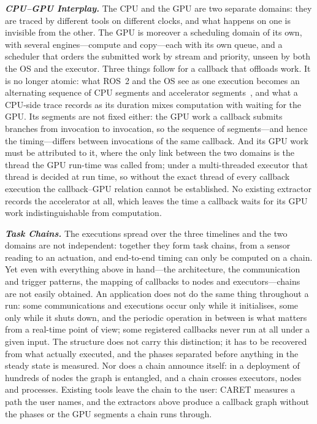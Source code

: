 \noindent
\textit{\textbf{CPU--GPU Interplay.}}
The CPU and the GPU are two separate domains: they are traced by different tools on different clocks, and what happens on one is invisible from the other. The GPU is moreover a scheduling domain of its own, with several engines---compute and copy---each with its own queue, and a scheduler that orders the submitted work by stream and priority, unseen by both the OS and the executor. Three things follow for a callback that offloads work. It is no longer atomic: what ROS~2 and the OS see as one execution becomes an alternating sequence of CPU segments and accelerator segments~\cite{enright-2024-paam}, and what a CPU-side trace records as its duration mixes computation with waiting for the GPU. Its segments are not fixed either: the GPU work a callback submits branches from invocation to invocation, so the sequence of segments---and hence the timing---differs between invocations of the same callback. And its GPU work must be attributed to it, where the only link between the two domains is the thread the GPU run-time was called from; under a multi-threaded executor that thread is decided at run time, so without the exact thread of every callback execution the callback--GPU relation cannot be established. No existing extractor records the accelerator at all, which leaves the time a callback waits for its GPU work indistinguishable from computation.

\noindent
\textit{\textbf{Task Chains.}}
The executions spread over the three timelines and the two domains are not independent: together they form task chains, from a sensor reading to an actuation, and end-to-end timing can only be computed on a chain. Yet even with everything above in hand---the architecture, the communication and trigger patterns, the mapping of callbacks to nodes and executors---chains are not easily obtained. An application does not do the same thing throughout a run: some communications and executions occur only while it initialises, some only while it shuts down, and the periodic operation in between is what matters from a real-time point of view; some registered callbacks never run at all under a given input. The structure does not carry this distinction; it has to be recovered from what actually executed, and the phases separated before anything in the steady state is measured. Nor does a chain announce itself: in a deployment of hundreds of nodes the graph is entangled, and a chain crosses executors, nodes and processes. Existing tools leave the chain to the user: CARET measures a path the user names, and the extractors above produce a callback graph without the phases or the GPU segments a chain runs through.

